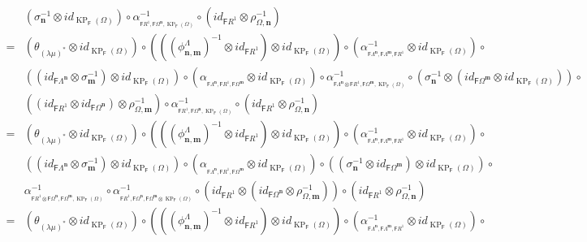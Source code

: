 \documentclass[12pt]{amsart}
\newcommand{\N}{\mathbf{n}}
\newcommand{\M}{\mathbf{m}}
\newcommand{\KP}{\operatorname{KP}}
\theoremstyle{definition}
\theoremstyle{remark}
\begin{document}
{\begin{align*}
    &\left(\sigma_\N^{-1}\otimes id_{\KP_\mathsf{F}(\Omega)}\right)\circ \alpha_{_{\mathsf{F}R^1,\mathsf{F}\Omega^\N,\KP_\mathsf{F}(\Omega)}}^{-1}\circ \left(id_{\mathsf{F}R^1}\otimes \rho_{\Omega,\N}^{-1}\right)\\
    =& \left(\theta_{(\lambda\mu)^*}\otimes id_{\KP_\mathsf{F}(\Omega)}\right)\circ \left(((\phi_{\N,\M}^\Lambda)^{-1}\otimes id_{\mathsf{F}R^1})\otimes id_{\KP_\mathsf{F}(\Omega)}\right)\circ \left(\alpha_{_{\mathsf{F}\Lambda^\N,\mathsf{F}\Lambda^\M,\mathsf{F}R^1}}^{-1}\otimes id_{\KP_\mathsf{F}(\Omega)}\right)\circ\\
    &\left((id_{\mathsf{F}\Lambda^\N}\otimes \sigma_\M^{-1})\otimes id_{\KP_\mathsf{F}(\Omega)}\right)\circ \left(\alpha_{_{\mathsf{F}\Lambda^\N,\mathsf{F}R^1,\mathsf{F}\Omega^\M}}\otimes id_{\KP_\mathsf{F}(\Omega)}\right)\circ \alpha_{_{\mathsf{F}\Lambda^\N\otimes \mathsf{F}R^1,\mathsf{F}\Omega^\M,\KP_\mathsf{F}(\Omega)}}^{-1}\circ \left(\sigma_\N^{-1}\otimes(id_{\mathsf{F}\Omega^\M}\otimes id_{\KP_\mathsf{F}(\Omega)})\right)\circ\\
    &\left((id_{\mathsf{F}R^1}\otimes id_{\mathsf{F}\Omega^\N})\otimes \rho_{\Omega,\M}^{-1}\right)\circ \alpha_{_{\mathsf{F}R^1,\mathsf{F}\Omega^\N,\KP_\mathsf{F}(\Omega)}}^{-1}\circ \left(id_{\mathsf{F}R^1}\otimes \rho_{\Omega,\N}^{-1}\right)\\
    =& \left(\theta_{(\lambda\mu)^*}\otimes id_{\KP_\mathsf{F}(\Omega)}\right)\circ \left(((\phi_{\N,\M}^\Lambda)^{-1}\otimes id_{\mathsf{F}R^1})\otimes id_{\KP_\mathsf{F}(\Omega)}\right)\circ \left(\alpha_{_{\mathsf{F}\Lambda^\N,\mathsf{F}\Lambda^\M,\mathsf{F}R^1}}^{-1}\otimes id_{\KP_\mathsf{F}(\Omega)}\right)\circ\\
    &\left((id_{\mathsf{F}\Lambda^\N}\otimes \sigma_\M^{-1})\otimes id_{\KP_\mathsf{F}(\Omega)}\right)\circ \left(\alpha_{_{\mathsf{F}\Lambda^\N,\mathsf{F}R^1,\mathsf{F}\Omega^\M}}\otimes id_{\KP_\mathsf{F}(\Omega)}\right)\circ \left((\sigma_\N^{-1}\otimes id_{\mathsf{F}\Omega^\M})\otimes id_{\KP_\mathsf{F}(\Omega)}\right)\circ\\ 
    &\alpha_{_{\mathsf{F}R^1\otimes \mathsf{F}\Omega^\N,\mathsf{F}\Omega^\M,\KP_\mathsf{F}(\Omega)}}^{-1}\circ \alpha_{_{\mathsf{F}R^1, \mathsf{F}\Omega^\N,\mathsf{F}\Omega^\M\otimes\KP_\mathsf{F}(\Omega)}}^{-1}\circ \left(id_{\mathsf{F}R^1}\otimes (id_{\mathsf{F}\Omega^\N}\otimes \rho_{\Omega,\M}^{-1})\right)\circ \left(id_{\mathsf{F}R^1}\otimes \rho_{\Omega,\N}^{-1}\right)\\
    =& \left(\theta_{(\lambda\mu)^*}\otimes id_{\KP_\mathsf{F}(\Omega)}\right)\circ \left(((\phi_{\N,\M}^\Lambda)^{-1}\otimes id_{\mathsf{F}R^1})\otimes id_{\KP_\mathsf{F}(\Omega)}\right)\circ \left(\alpha_{_{\mathsf{F}\Lambda^\N,\mathsf{F}\Lambda^\M,\mathsf{F}R^1}}^{-1}\otimes id_{\KP_\mathsf{F}(\Omega)}\right)\circ\\

\end{align*}}
\end{document}
